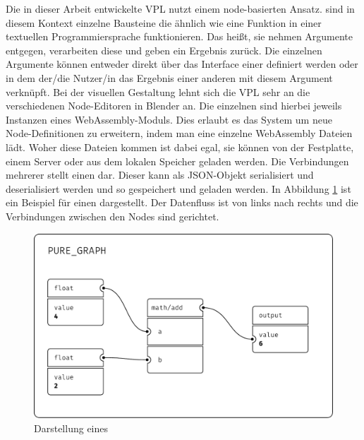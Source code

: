 \documentclass[ngerman]{article}
\begin{document}
Die in dieser Arbeit entwickelte VPL nutzt einem node-basierten Ansatz. 
 sind in diesem Kontext einzelne Bausteine die ähnlich wie eine Funktion in einer textuellen Programmiersprache funktionieren.
Das heißt, sie nehmen Argumente entgegen, verarbeiten diese und geben ein Ergebnis zurück.
\br
Die einzelnen Argumente können entweder direkt über das Interface einer  definiert werden oder in dem der/die Nutzer/in das Ergebnis einer anderen  mit diesem Argument verknüpft.
Bei der visuellen Gestaltung lehnt sich die VPL sehr an die verschiedenen Node-Editoren in Blender an.
\br
Die einzelnen  sind hierbei jeweils Instanzen eines WebAssembly-Moduls. 
Dies erlaubt es das System um neue Node-Definitionen zu erweitern, indem man eine einzelne WebAssembly Dateien lädt.
Woher diese Dateien kommen ist dabei egal, sie können von der Festplatte, einem Server oder aus dem lokalen Speicher geladen werden.
\br
Die Verbindungen mehrerer  stellt einen  dar. 
Dieser  kann als JSON-Objekt serialisiert und deserialisiert werden und so gespeichert und geladen werden.
\br
In Abbildung \ref{sec:PURE_GRAPH} ist ein Beispiel für einen  dargestellt. 
Der Datenfluss ist von links nach rechts und die Verbindungen zwischen den Nodes sind gerichtet.


\begin{figure}[htbp]
    \centering
    \begin{minipage}[b]{0.8\textwidth}
        \centering
        \includegraphics[width=\textwidth]{graphics/PURE_GRAPH.pdf}
        \caption{Darstellung eines }
        \label{sec:PURE_GRAPH}
    \end{minipage}
\end{figure}
\end{document}
